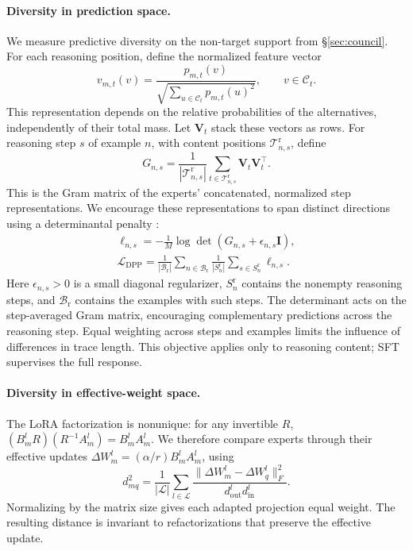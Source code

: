 \documentclass[11pt,twocolumn]{article}
\newcommand{\Tset}{\mathcal{T}}
\newcommand{\Lcal}{\mathcal{L}}
\newcommand{\Bcal}{\mathcal{B}}
\newcommand{\Ccal}{\mathcal{C}}
\begin{document}
\paragraph{Diversity in prediction space.}
We measure predictive diversity on the non-target support from
\S\ref{sec:council}. For each reasoning position, define the normalized
feature vector
\begin{equation}
 v_{m,t}(v)=\frac{p_{m,t}(v)}
                  {\sqrt{\sum_{u\in\Ccal_t}p_{m,t}(u)^2}},
 \qquad v\in\Ccal_t.
 \label{eq:stage1-features}
\end{equation}
This representation depends on the relative probabilities of the alternatives,
independently of their total mass. Let $\mathbf V_t$ stack these vectors as
rows. For reasoning step $s$ of example $n$, with content positions
$\Tset_{n,s}^{\mathrm r}$, define
\begin{equation}
 G_{n,s}=\frac{1}{|\Tset_{n,s}^{\mathrm r}|}
           \sum_{t\in\Tset_{n,s}^{\mathrm r}}
                   \mathbf V_t\mathbf V_t^{\top}.
 \label{eq:stage1-gram}
\end{equation}
This is the Gram matrix of the experts' concatenated, normalized step
representations. We encourage these representations to span distinct
directions using a determinantal penalty \citep{kulesza2012dpp}:
\begin{equation}
 \begin{gathered}
 \ell_{n,s}=-\frac{1}{M}\log\det(G_{n,s}+\epsilon_{n,s}\mathbf I),\\
 \Lcal_{\mathrm{DPP}}=
 \frac{1}{|\Bcal_{\mathrm r}|}
 \sum_{n\in\Bcal_{\mathrm r}}\frac{1}{|S_n^{\mathrm r}|}
 \sum_{s\in S_n^{\mathrm r}}\ell_{n,s}.
 \end{gathered}
 \label{eq:dpp}
\end{equation}
Here $\epsilon_{n,s}>0$ is a small diagonal regularizer,
$S_n^{\mathrm r}$ contains the nonempty reasoning steps, and
$\Bcal_{\mathrm r}$ contains the examples with such steps. The determinant
acts on the step-averaged Gram matrix, encouraging complementary predictions
across the reasoning step. Equal weighting across steps and examples limits
the influence of differences in trace length. This objective applies only to
reasoning content; SFT supervises the full response.

\paragraph{Diversity in effective-weight space.}
The LoRA factorization is nonunique: for any invertible $R$,
$(B_m^lR)(R^{-1}A_m^l)=B_m^lA_m^l$. We therefore compare experts through
their effective updates $\Delta W_m^l=(\alpha/r)B_m^lA_m^l$, using
\begin{equation}
 d_{mq}^{2}=\frac{1}{|\Lcal|}\sum_{l\in\Lcal}
 \frac{\|\Delta W_m^l-\Delta W_q^l\|_F^2}
      {d_{\mathrm{out}}^l d_{\mathrm{in}}^l}.
 \label{eq:stage1-distance}
\end{equation}
Normalizing by the matrix size gives each adapted projection equal weight.
The resulting distance is invariant to refactorizations that preserve the
effective update.
\end{document}

